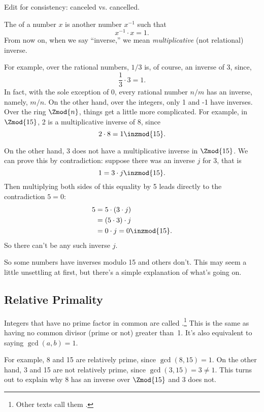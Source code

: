 \begin{editingnotes}
Edit for consistency: canceled vs. cancelled.
\end{editingnotes}

The  of a number $x$ is another number
$x^{-1}$ such that
\[
x^{-1} \cdot x  = 1.
\]
From now on, when we say ``inverse,'' we mean \emph{multiplicative}
(not relational) inverse.

For example, over the rational numbers, $1 / 3$ is, of course, an
inverse of 3, since,
\[
\frac{1}{3} \cdot 3 = 1.
\]
In fact, with the sole exception of 0, every rational number $n/m$ has
an inverse, namely, $m/n$.  On the other hand, over the integers, only
1 and -1 have inverses.  Over the ring $\Zmod{n}$, things get a little
more complicated.  For example, in $\Zmod{15}$, 2 is a multiplicative
inverse of 8, since
\[
2 \cdot 8 = 1 \inzmod{15}.
\]

On the other hand, 3 does not have a multiplicative inverse in
$\Zmod{15}$.  We can prove this by contradiction: suppose there was an
inverse $j$ for 3, that is
\[
1 = 3 \cdot j \inzmod{15}.
\]
Then multiplying both sides of this equality by 5 leads directly to
the contradiction $5 = 0$:
\begin{align*}
5 & = 5 \cdot (3 \cdot j)\\
  & = (5 \cdot 3) \cdot j\\
  & = 0 \cdot j = 0 \inzmod{15}.
\end{align*}
So there can't be any such inverse $j$.

So some numbers have inverses modulo 15 and others don't.  This may seem
a little unsettling at first, but there's a simple explanation of
what's going on.

\subsection{Relative Primality}

Integers that have no prime factor in common are called
.\footnote{Other texts call them
  .}  This is the same as having no common divisor
(prime or not) greater than~1.  It's also equivalent to saying
$\gcd(a, b) = 1$.

For example, 8 and 15 are relatively prime, since $\gcd(8, 15) = 1$.
On the other hand, 3 and 15 are not relatively prime, since $\gcd(3,
15) = 3 \neq 1$.  This turns out to explain why 8 has an inverse over
$\Zmod{15}$ and 3 does not.

